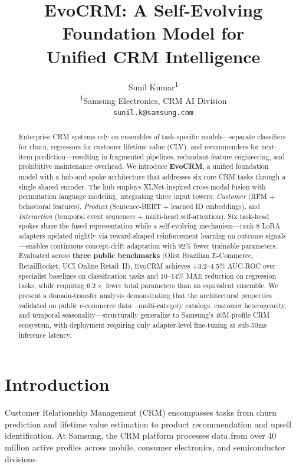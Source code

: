 \documentclass[10pt,twocolumn]{article}
\title{\Large\bfseries EvoCRM: A Self-Evolving Foundation Model for\\Unified CRM Intelligence}
\author{
  Sunil Kumar\textsuperscript{1} \\[2pt]
  \textsuperscript{1}Samsung Electronics, CRM AI Division \\
  \texttt{sunil.k@samsung.com}
}
\date{}
\begin{document}
\maketitle
\thispagestyle{empty}

\begin{abstract}
\noindent
Enterprise CRM systems rely on ensembles of task-specific models---separate classifiers for churn, regressors for customer lifetime value (CLV), and recommenders for next-item prediction---resulting in fragmented pipelines, redundant feature engineering, and prohibitive maintenance overhead. We introduce \textbf{EvoCRM}, a unified foundation model with a hub-and-spoke architecture that addresses six core CRM tasks through a single shared encoder. The hub employs XLNet-inspired cross-modal fusion with permutation language modeling, integrating three input towers: \emph{Customer} (RFM + behavioral features), \emph{Product} (Sentence-BERT + learned ID embeddings), and \emph{Interaction} (temporal event sequences + multi-head self-attention). Six task-head spokes share the fused representation while a self-evolving mechanism---rank-8 LoRA adapters updated nightly via reward-shaped reinforcement learning on outcome signals---enables continuous concept-drift adaptation with 92\% fewer trainable parameters. Evaluated across \textbf{three public benchmarks} (Olist Brazilian E-Commerce, RetailRocket, UCI Online Retail~II), EvoCRM achieves +3.2--4.5\% AUC-ROC over specialist baselines on classification tasks and 10--14\% MAE reduction on regression tasks, while requiring $6.2\times$ fewer total parameters than an equivalent ensemble. We present a domain-transfer analysis demonstrating that the architectural properties validated on public e-commerce data---multi-category catalogs, customer heterogeneity, and temporal seasonality---structurally generalize to Samsung's 40M-profile CRM ecosystem, with deployment requiring only adapter-level fine-tuning at sub-50ms inference latency.
\end{abstract}

\section{Introduction}

Customer Relationship Management (CRM) encompasses tasks from churn prediction and lifetime value estimation to product recommendation and upsell identification. At Samsung, the CRM platform processes data from over 40 million active profiles across mobile, consumer electronics, and semiconductor divisions.
\end{document}
